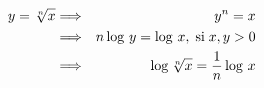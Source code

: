 \documentclass{article} %
\begin{document}
\begin{eqnarray*}
	y=\sqrt[n]{x} &\Longrightarrow & y^n=x \\
	&\Longrightarrow & n\log \,y=\log \,x,\;\mbox{si}\;x,y>0\\
	& \Longrightarrow & \log \sqrt[n]{x}={1 \over n}\log \,x
\end{eqnarray*}
\end{document}
